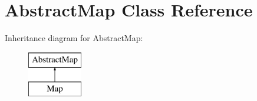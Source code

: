 \hypertarget{class_abstract_map}{}\section{Abstract\+Map Class Reference}
\label{class_abstract_map}
Inheritance diagram for Abstract\+Map\+:\begin{figure}[H]
\begin{center}
\leavevmode
\includegraphics[height=2.000000cm]{class_abstract_map}
\end{center}
\end{figure}
